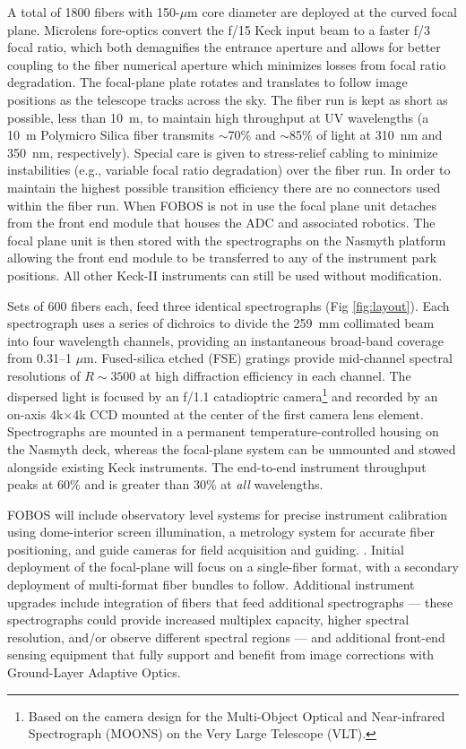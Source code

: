 A total of 1800 fibers with 150-$\mu$m core diameter are deployed at the
curved focal plane. Microlens fore-optics convert the f/15 Keck input
beam to a faster f/3 focal ratio, which both demagnifies the entrance
aperture and allows for better coupling to the fiber numerical aperture
which minimizes losses from focal ratio degradation.  The focal-plane
plate rotates and translates to follow image positions as the telescope
tracks across the sky. The fiber run is kept as short as possible, less
than 10~m, to maintain high throughput at UV wavelengths (a 10~m
Polymicro Silica fiber transmits $\sim$70\% and $\sim$85\% of light at
310~nm and 350~nm, respectively). Special care is given to stress-relief
cabling to minimize instabilities (e.g., variable focal ratio
degradation) over the fiber run. In order to maintain the highest
possible transition efficiency there are no connectors used within the
fiber run.  When FOBOS is not in use the focal plane unit detaches from
the front end module that houses the ADC and associated robotics.  The
focal plane unit is then stored with the spectrographs on the Nasmyth
platform allowing the front end module to be transferred to any of the
instrument park positions.  All other Keck-II instruments can still be
used without modification.

Sets of 600 fibers each, feed three identical spectrographs (Fig
\ref{fig:layout}). Each spectrograph uses a series of dichroics to
divide the 259~mm collimated beam into four wavelength channels,
providing an instantaneous broad-band coverage from 0.31--1 $\mu$m.
Fused-silica etched (FSE) gratings provide mid-channel spectral
resolutions of $R\sim3500$ at high diffraction efficiency in each
channel. The dispersed light is focused by an f/1.1 catadioptric
camera\footnote{Based on the camera design for the Multi-Object Optical
and Near-infrared Spectrograph (MOONS) on the Very Large Telescope
(VLT).} and recorded by an on-axis 4k$\times$4k CCD mounted at the
center of the first camera lens element.  Spectrographs are mounted in a
permanent temperature-controlled housing on the Nasmyth deck, whereas
the focal-plane system can be unmounted and stowed alongside existing
Keck instruments. The end-to-end instrument throughput peaks at 60\% and
is greater than 30\% at {\it all} wavelengths.

FOBOS will include observatory level systems for precise instrument
calibration using dome-interior screen illumination, a metrology system
for accurate fiber positioning, and guide cameras for field acquisition
and guiding. . Initial deployment of the focal-plane will focus on a
single-fiber format, with a secondary deployment of multi-format fiber
bundles to follow. Additional instrument upgrades include integration of
fibers that feed additional spectrographs --- these spectrographs could
provide increased multiplex capacity, higher spectral resolution, and/or
observe different spectral regions --- and additional front-end sensing
equipment that fully support and benefit from image corrections with
Ground-Layer Adaptive Optics.

